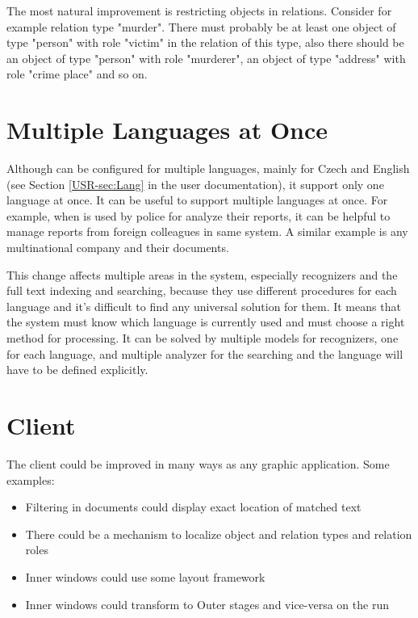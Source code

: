The most natural improvement is restricting objects in relations. Consider for
example relation type "murder". There must probably be at least one object of
type "person" with role "victim" in the relation of this type, also there
should be an object of type "person" with role "murderer", an object of type
"address" with role "crime place" and so on.

\section{Multiple Languages at Once}
Although \textan{} can be configured for multiple languages, mainly for Czech
and English (see Section \ref{USR-sec:Lang} in the user documentation), it support
only one language at once. It can be useful to support multiple languages at once.
For example, when \textan{} is used by police for analyze their reports, it can
be helpful to manage reports from foreign colleagues in same system. A similar
example is any multinational company and their documents.

This change affects multiple areas in the system, especially recognizers and
the full text indexing and searching, because they use different procedures for
each language and it's difficult to find any universal solution for them. It means
that the system must know which language is currently used and must choose a right
method for processing. It can be solved by multiple models for recognizers, one
for each language, and multiple analyzer for the searching and the language will
have to be defined explicitly.

\section{Client}
The \textan{} client could be improved in many ways as any graphic application.
Some examples:

\begin{itemize}
	\item Filtering in documents could display exact location of matched text
	\item There could be a mechanism to localize object and relation types and
	relation roles
	\item Inner windows could use some layout framework
	\item Inner windows could transform to Outer stages and vice-versa on the
	run
\end{itemize}

